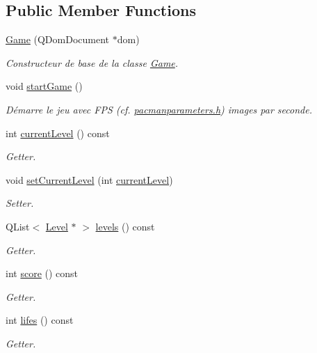 \subsection*{Public Member Functions}
\begin{DoxyCompactItemize}
\item 
\hyperlink{class_game_a07651e12402cbf4ffb116870594cb347}{Game} (Q\+Dom\+Document $\ast$dom)
\begin{DoxyCompactList}\small\item\em Constructeur de base de la classe \hyperlink{class_game}{Game}. \end{DoxyCompactList}\item 
void \hyperlink{class_game_ae8638ccdb0ef3bf39a6affa30aa1258f}{start\+Game} ()
\begin{DoxyCompactList}\small\item\em Démarre le jeu avec F\+P\+S (cf. \hyperlink{pacmanparameters_8h_source}{pacmanparameters.\+h}) images par seconde. \end{DoxyCompactList}\item 
int \hyperlink{class_game_aa23771d9b5897ab65aae22f930b6e7a8}{current\+Level} () const 
\begin{DoxyCompactList}\small\item\em Getter. \end{DoxyCompactList}\item 
void \hyperlink{class_game_ad7c1d10b807c0707e4b9f71e975135f4}{set\+Current\+Level} (int \hyperlink{class_game_aa23771d9b5897ab65aae22f930b6e7a8}{current\+Level})
\begin{DoxyCompactList}\small\item\em Setter. \end{DoxyCompactList}\item 
Q\+List$<$ \hyperlink{class_level}{Level} $\ast$ $>$ \hyperlink{class_game_a827328224e2d00cca5534a87b655e3c4}{levels} () const 
\begin{DoxyCompactList}\small\item\em Getter. \end{DoxyCompactList}\item 
int \hyperlink{class_game_acd638924aa59358846e55e78d272a2ec}{score} () const 
\begin{DoxyCompactList}\small\item\em Getter. \end{DoxyCompactList}\item 
int \hyperlink{class_game_a5cf4da142ff72734ee8713b2c37b2b9b}{lifes} () const 
\begin{DoxyCompactList}\small\item\em Getter. \end{DoxyCompactList}\item 

\end{DoxyCompactItemize}
